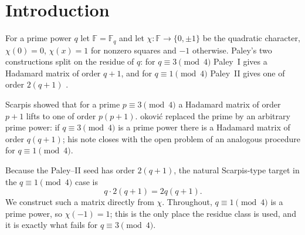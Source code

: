 \documentclass[11pt]{article}
\newcommand{\F}{\mathbb F}
\begin{document}
\begin{abstract}
A second reading of the same matrix is arithmetic rather than
combinatorial.  The Paley--II blocks are the real \(2\times2\)
representation of the Gaussian units, and through it the construction
factors through a Butson matrix \(\Gamma\in BH\bigl(q(q+1),4\bigr)\) of
half the order whose Turyn double is \(H\).  This locates the note
against a second line in the literature: composing the complex Scarpis
lift of Sargent, Lee and Rushall (2024) with the same doubling gives a
further route to the existence statement, alongside Farouk and Wang,
and \(\Gamma\) is equivalent to one of their outputs.

We also make the family's coverage explicit:
every order \(2q(q+1)\) whose odd part is at most \(3000\) is already
recorded in the
standard tables, and the smallest order lying beyond that audited range,
\(q=81\) (order \(13284=4\cdot 41\cdot 81\)), also follows from a
classical Turyn product using \(T\)-matrices of order \(41\) and
Williamson-type matrices of order \(81=9^{2}\).  We exhibit the
witnessing constructions, identify the smallest
unaudited order, give a second worked example lying beyond the reach of
the elementary screen, and
tabulate, for \(q\le3000\), those orders for which a deliberately
restricted elementary screen supplies no witness, emphasising that these
are \emph{unaudited} rather than open.
\end{abstract}

\section{Introduction}

For a prime power \(q\) let \(\F=\F_q\) and let
\(\chi\colon\F\to\{0,\pm1\}\) be the quadratic character,
\(\chi(0)=0\), \(\chi(x)=1\) for nonzero squares and \(-1\) otherwise.
Paley's two constructions split on the residue of \(q\): for
\(q\equiv 3\pmod 4\) Paley~I gives a Hadamard matrix of order \(q+1\),
and for \(q\equiv 1\pmod 4\) Paley~II gives one of order \(2(q+1)\)
\cite{Paley1933}.

Scarpis \cite{Scarpis1898} showed that for a prime \(p\equiv 3\pmod 4\) a
Hadamard matrix of order \(p+1\) lifts to one of order \(p(p+1)\).
\DJ okovi\'c \cite{Djokovic2016} replaced the prime by an arbitrary prime
power: if \(q\equiv 3\pmod 4\) is a prime power there is a Hadamard
matrix of order \(q(q+1)\); his note closes with the open problem of an
analogous procedure for \(q\equiv 1\pmod 4\).

Because the Paley--II seed has order \(2(q+1)\), the natural
Scarpis-type target in the \(q\equiv 1\pmod 4\) case is
\[
        q\cdot 2(q+1)=2q(q+1).
\]
We construct such a matrix directly from \(\chi\).  Throughout, \(q\equiv
1\pmod 4\) is a prime power, so \(\chi(-1)=1\); this is the only place
the residue class is used, and it is exactly what fails for
\(q\equiv 3\pmod 4\).
\end{document}

